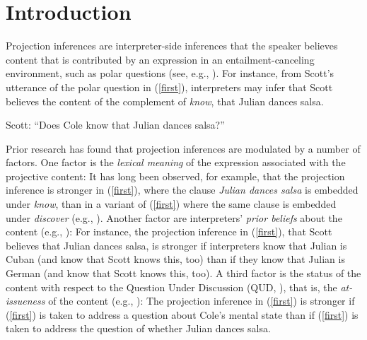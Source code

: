 \documentclass[11pt,fleqn]{article}
\newcommand{\6}{\mbox{$[\hspace*{-.6mm}[$}}
\newcommand{\9}{\mbox{$]\hspace*{-.6mm}]$}}
\begin{document}
\clearpage
{} 

\newpage


\section{Introduction}\label{s1}

Projection inferences are interpreter-side inferences that the speaker believes content that is contributed by an expression in an entailment-canceling environment, such as polar questions (see, e.g., \citealt{kiparsky-kiparsky70,potts05}). For instance, from Scott's utterance of the polar question in (\ref{first}), interpreters may infer that Scott believes the content of the complement of {\em know}, that Julian dances salsa. 

\begin{exe}
\ex\label{first} Scott: ``Does Cole know that Julian dances salsa?''
\end{exe}

Prior research has found that projection inferences are modulated by a number of factors. One factor is the \emph{lexical meaning} of the expression associated with the projective content: It has long been observed, for example, that the projection inference is stronger in (\ref{first}), where the clause {\em Julian dances salsa} is embedded under {\em know}, than in a variant of (\ref{first}) where the same clause is embedded  under {\em discover} (e.g., \citealt{karttunen71b,tbd-variability,degen-tonhauser-language}). Another factor are interpreters' \emph{prior beliefs} about the content (e.g., \citealt{mahler2020,degen-tonhauser-openmind}): For instance, the projection inference in (\ref{first}), that Scott believes that Julian dances salsa, is stronger if interpreters know that Julian is Cuban (and know that Scott knows this, too) than if they know that Julian is German (and know that Scott knows this, too). A third factor is the status of the content with respect to the Question Under Discussion (QUD, \citealt{roberts12}), that is, the \emph{at-issueness} of the content (e.g., \citealt{brst-salt10,best-question,cummins-rohde2015,tonhauser-salt26,tbd-variability,djaerv-bacovcin-salt27,djaerv-bacovcin2020}): The projection inference in (\ref{first}) is stronger if (\ref{first}) is taken to address a question about Cole's mental state than if (\ref{first}) is taken to address the question of whether Julian dances salsa.
\end{document}
